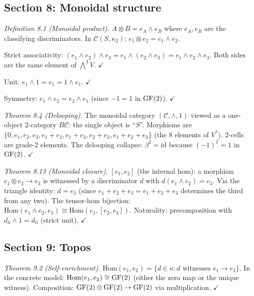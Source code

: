\subsection{Section 8: Monoidal structure}

\emph{Definition 8.1 (Monoidal product).}
$A \otimes B = e_A \wedge e_B$ where $e_A, e_B$ are
the classifying discriminators. In $\mathcal{C}(S,
\kappa_2)$: $e_1 \otimes e_2 = e_1 \wedge e_2$.

Strict associativity: $(e_1 \wedge e_2) \wedge e_3
= e_1 \wedge (e_2 \wedge e_3) = e_1 \wedge e_2
\wedge e_3$. Both sides are the same element of
$\bigwedge^3 V$. $\checkmark$

Unit: $e_1 \wedge 1 = e_1 = 1 \wedge e_1$.
$\checkmark$

Symmetry: $e_1 \wedge e_2 = e_2 \wedge e_1$
(since $-1 = 1$ in $\operatorname{GF}(2)$). $\checkmark$

\emph{Theorem 8.4 (Delooping).}
The monoidal category $(\mathcal{C}, \wedge, 1)$
viewed as a one-object 2-category $B\mathcal{C}$:
the single object is ``$S$''. Morphisms are
$\{0, e_1, e_2, e_3, e_1{+}e_2, e_1{+}e_3,
e_2{+}e_3, e_1{+}e_2{+}e_3\}$ (the 8 elements of
$V^*$). 2-cells are grade-2 elements. The delooping
collapse: $\beta^2 = \mathrm{id}$ because $(-1)^2 = 1$
in $\operatorname{GF}(2)$. $\checkmark$

\emph{Theorem 8.13 (Monoidal closure).}
$[e_1, e_2]$ (the internal hom): a morphism
$e_1 \otimes e_2 \to e_3$ is witnessed by a
discriminator $d$ with $d(e_1 \wedge e_2) = e_3$.
Via the triangle identity: $d = e_3$ (since
$e_1 + e_2 + e_3 = e_1{+}e_2{+}e_3$ determines
the third from any two). The tensor-hom bijection:
$\mathrm{Hom}(e_1 \wedge e_2, e_3) \cong
\mathrm{Hom}(e_1, [e_2, e_3])$. Naturality:
precomposition with $d_h \wedge 1 = d_h$ (strict unit).
$\checkmark$

\subsection{Section 9: Topos}

\emph{Theorem 9.2 (Self-enrichment).}
$\mathrm{Hom}(e_1, e_2) = \{d \in \kappa :
d \text{ witnesses } e_1 \to e_2\}$. In the concrete
model: $\mathrm{Hom}(e_1, e_2) \cong \operatorname{GF}(2)$ (either
the zero map or the unique witness). Composition:
$\operatorname{GF}(2) \otimes \operatorname{GF}(2) \to \operatorname{GF}(2)$ via multiplication.
$\checkmark$

